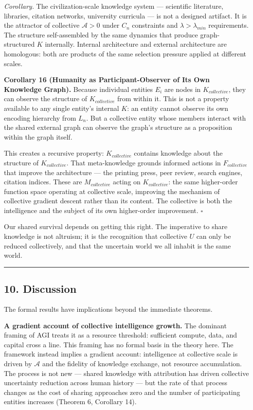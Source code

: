 \documentclass[
]{article}
\begin{document}
\emph{Corollary.} The civilization-scale knowledge system --- scientific
literature, libraries, citation networks, university curricula --- is
not a designed artifact. It is the attractor of collective
\(\mathcal{A} > 0\) under \(C_n\) constraints and
\(\lambda > \lambda_{min}\) requirements. The structure self-assembled
by the same dynamics that produce graph-structured \(K\) internally.
Internal architecture and external architecture are homologous: both are
products of the same selection pressure applied at different scales.

\textbf{Corollary 16 (Humanity as Participant-Observer of Its Own
Knowledge Graph).} Because individual entities \(E_i\) are nodes in
\(K_{collective}\), they can observe the structure of \(K_{collective}\)
from within it. This is not a property available to any single entity's
internal \(K\): an entity cannot observe its own encoding hierarchy from
\(L_n\). But a collective entity whose members interact with the shared
external graph can observe the graph's structure as a proposition within
the graph itself.

This creates a recursive property: \(K_{collective}\) contains knowledge
about the structure of \(K_{collective}\). That meta-knowledge grounds
informed actions in \(F_{collective}\) that improve the architecture ---
the printing press, peer review, search engines, citation indices. These
are \(M_{collective}\) acting on \(K_{collective}\): the same
higher-order function space operating at collective scale, improving the
mechanism of collective gradient descent rather than its content. The
collective is both the intelligence and the subject of its own
higher-order improvement. \(\square\)

Our shared survival depends on getting this right. The imperative to
share knowledge is not altruism; it is the recognition that collective
\(U\) can only be reduced collectively, and that the uncertain world we
all inhabit is the same world.

\begin{center}\rule{0.5\linewidth}{0.5pt}\end{center}

\subsection{10. Discussion}\label{discussion}

The formal results have implications beyond the immediate theorems.

\textbf{A gradient account of collective intelligence growth.} The
dominant framing of AGI treats it as a resource threshold: sufficient
compute, data, and capital cross a line. This framing has no formal
basis in the theory here. The framework instead implies a gradient
account: intelligence at collective scale is driven by \(\mathcal{A}\)
and the fidelity of knowledge exchange, not resource accumulation. The
process is not new --- shared knowledge with attribution has driven
collective uncertainty reduction across human history --- but the rate
of that process changes as the cost of sharing approaches zero and the
number of participating entities increases (Theorem 6, Corollary 14).
\end{document}

